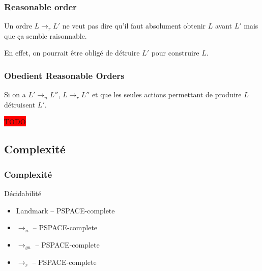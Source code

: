 \begin{frame}
  \frametitle{Reasonable order}

  \begin{alertblock}{}
    Un ordre $L \rightarrow_r L'$ ne veut pas dire qu'il faut absolument obtenir $L$ avant $L'$ mais que ça semble raisonnable.

    En effet, on pourrait être obligé de détruire $L'$ pour construire $L$.
  \end{alertblock}
\end{frame}
  

\begin{frame}
  \frametitle{Obedient Reasonable Orders}

  \begin{example}
    Si on a $L' \rightarrow_n L''$, $L \rightarrow_r L''$ et que les seules actions permettant de produire $L$ détruisent $L'$.

    \colorbox{red}{TODO}
  \end{example}
\end{frame}

  \subsection{Complexité}
\begin{frame}
  \frametitle{Complexité}
  \begin{block}{Décidabilité}
    \begin{itemize}
      \item Landmark -- PSPACE-complete
      \item $\rightarrow_n$ -- PSPACE-complete
      \item $\rightarrow_{gn}$ -- PSPACE-complete
      \item $\rightarrow_{r}$ -- PSPACE-complete
    \end{itemize}
  \end{block}
\end{frame}

